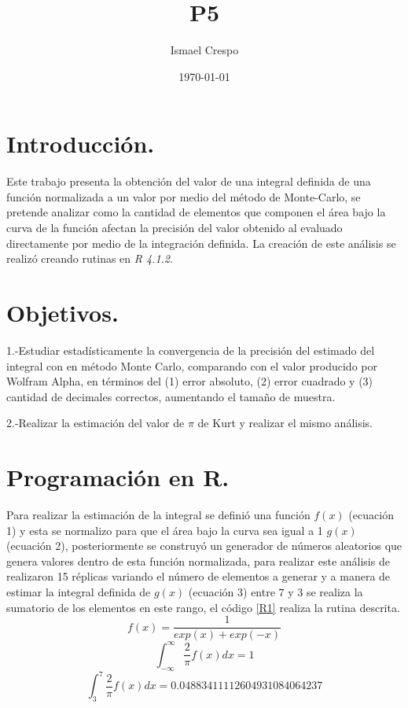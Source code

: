 \documentclass{article}
\title{P5}
\author{Ismael Crespo}
\date{\today}
\begin{document}
\maketitle

\section{Introducción.}
Este trabajo presenta la obtención del valor de una integral definida de una función normalizada a un valor por medio del método de Monte-Carlo, se pretende analizar como la cantidad de elementos que componen el área bajo la curva de la función afectan la precisión del valor obtenido al evaluado directamente por medio de la integración definida. La creación de este análisis se realizó creando rutinas en \emph{R 4.1.2}.
\section{Objetivos.}
1.-Estudiar estadísticamente la convergencia de la precisión del estimado del integral con en método Monte Carlo, comparando con el valor producido por Wolfram Alpha, en términos del (1) error absoluto, (2) error cuadrado y (3) cantidad de decimales correctos, aumentando el tamaño de muestra.

2.-Realizar la estimación del valor de $\pi$ de Kurt \citep{kurt} y realizar el mismo análisis. 

\section{Programación en R.}
Para realizar la estimación de la integral se definió una función $f(x)$ (ecuación 1) y esta se normalizo para que el área bajo la curva sea igual a 1 $g(x)$ (ecuación 2), posteriormente se construyó un generador de números aleatorios que genera valores dentro de esta función normalizada, para realizar este análisis de realizaron 15 réplicas variando el número de elementos a generar y a manera de estimar la integral definida de $g(x)$ (ecuación 3) entre $7$ y $3$ se realiza la sumatorio de los elementos en este rango, el código \ref{R1} realiza la rutina descrita.
\begin{equation}
   f(x)= \frac{1}{exp(x)+exp(-x)}
\end{equation}
\begin{equation}
   \int_{-\infty}^{\infty} \frac{2}{\pi} f(x) dx =1
\end{equation}
\begin{equation}
   \int_{3}^{7} \frac{2}{\pi} f(x) dx =0.04883411112604931084064237
\end{equation}
\end{document}
